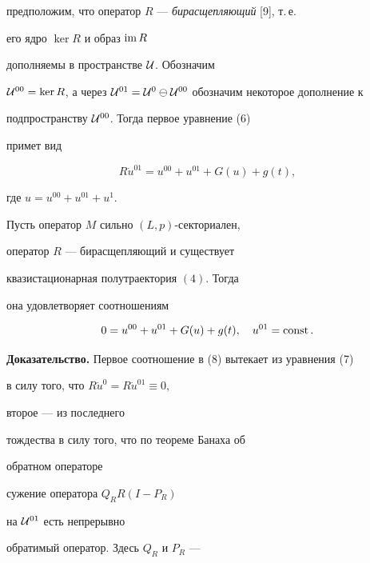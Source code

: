 предположим, что оператор $R$ --- {\it бирасщепляющий} [9], т.\,е.


его ядро $\ker R$ и образ $\operatorname{im} R$


дополняемы в пространстве ${\cal U}$. Обозначим


${\cal U}^{00}=\ker R$, а через ${\cal U}^{01}={\cal U}^{0} \ominus


{\cal U}^{00}$ обозначим некоторое дополнение к


подпространству ${\cal U}^{00}$. Тогда первое уравнение (6)


примет вид


\begin{equation}


R \Dot u^{01}=u^{00}+u^{01}+G(u)+g(t),


\end{equation}


где $u=u^{00}+u^{01}+u^1$.





\begin{thm}


Пусть оператор $M$ сильно $(L,p)$-секториален,


оператор $R$ --- бирасщепляющий и существует


квазистационарная полутраектория $(4)$. Тогда


она удовлетворяет соотношениям


\begin{equation}


0=u^{00}+u^{01}+G(u)+g(t),\quad


u^{01}=\const.


\end{equation}


\end{thm}





{\bf Доказательство.} Первое соотношение в (8) вытекает из уравнения (7)


в силу того, что $R \Dot u^0=R \Dot u^{01} \equiv 0$,


второе --- из последнего


тождества в силу того, что по теореме Банаха об


обратном операторе


сужение оператора $Q_R R(I-P_R)$


на ${\cal U}^{01}$ есть непрерывно


обратимый оператор. Здесь $Q_R$ и $P_R$ ---


